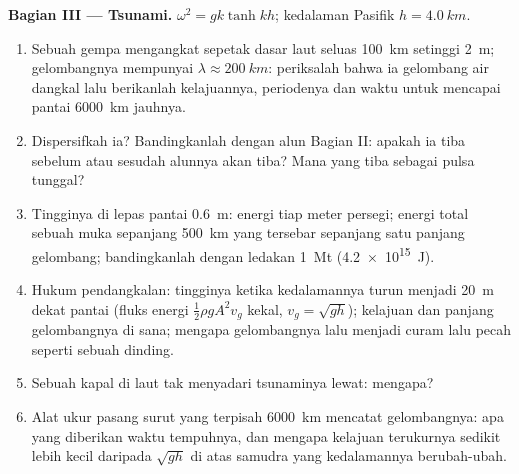 \begin{problem}
\medskip
\noindent\textbf{Bagian III --- Tsunami.}
$\omega^2 = gk\tanh kh$; kedalaman Pasifik $h = \qty{4.0}{km}$.
\begin{enumerate}[resume]
  \item Sebuah gempa mengangkat sepetak dasar laut seluas \qty{100}{km} setinggi
        \qty{2}{m}; gelombangnya mempunyai $\lambda \approx \qty{200}{km}$: periksalah bahwa ia
        gelombang air dangkal lalu berikanlah kelajuannya, periodenya dan waktu untuk
        mencapai pantai \qty{6000}{km} jauhnya.
  \item Dispersifkah ia? Bandingkanlah dengan alun Bagian II: apakah ia
        tiba sebelum atau sesudah alunnya akan tiba? Mana yang tiba sebagai
        pulsa tunggal?
  \item Tingginya di lepas pantai \qty{0.6}{m}: energi tiap meter persegi;
        energi total sebuah muka sepanjang \qty{500}{km} yang tersebar sepanjang satu
        panjang gelombang; bandingkanlah dengan ledakan \qty{1}{Mt} (\qty{4.2e15}{J}).
  \item Hukum pendangkalan: tingginya ketika kedalamannya turun menjadi \qty{20}{m} dekat
        pantai (fluks energi $\tfrac12\rho gA^2v_g$ kekal, $v_g = \sqrt{gh}$);
        kelajuan dan panjang gelombangnya di sana; mengapa gelombangnya lalu menjadi curam lalu
        pecah seperti sebuah dinding.
  \item Sebuah kapal di laut tak menyadari tsunaminya lewat: mengapa?
  \item Alat ukur pasang surut yang terpisah \qty{6000}{km} mencatat gelombangnya: apa yang
        diberikan waktu tempuhnya, dan mengapa kelajuan terukurnya sedikit
        lebih kecil daripada $\sqrt{gh}$ di atas samudra yang kedalamannya berubah-ubah.
\end{enumerate}


\end{problem}

